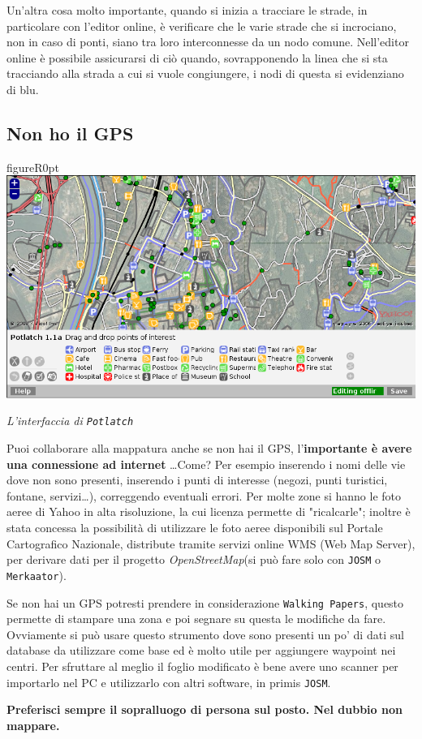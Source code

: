 \documentclass[a4paper,twoside,12pt,]{article}
\newcommand{\osm}{\emph{OpenStreetMap}\xspace}
\newcommand{\gps}{GPS\xspace}
\newcommand{\soft}[1]{\texttt{#1}}
\begin{document}
Un'altra cosa molto importante, quando si inizia a tracciare le strade, in particolare con l'editor online, è verificare che le varie strade che si incrociano, non in caso di ponti, siano tra loro interconnesse da un nodo comune. Nell'editor online è possibile assicurarsi di ciò quando, sovrapponendo la linea che si sta tracciando alla strada a cui si vuole congiungere, i nodi di questa si evidenziano di blu.
\subsection{Non ho il \gps}
\begin{wrapfloat}{figure}{R}{0pt}
 \includegraphics[width=0.7\columnwidth]{potlatch.png}
 \caption{\textit{L'interfaccia di \soft{Potlatch}}}
\end{wrapfloat}
Puoi collaborare alla mappatura anche se non hai il \gps, l'\textbf{importante è avere una connessione ad internet} \dots Come? Per esempio inserendo i nomi delle vie dove non sono presenti, inserendo i punti di interesse (negozi, punti turistici, fontane, servizi\dots), correggendo eventuali errori. Per molte zone si hanno le foto aeree di Yahoo in alta risoluzione, la cui licenza permette di "ricalcarle"; inoltre è stata concessa la possibilità di utilizzare le foto aeree disponibili sul Portale Cartografico Nazionale, distribute tramite servizi online WMS (Web Map Server), per derivare dati per il progetto \osm (si può fare solo con \soft{JOSM} o \soft{Merkaator}). 

Se non hai un \gps potresti prendere in considerazione \soft{Walking Papers}, questo permette di stampare una zona e poi segnare su questa le modifiche da fare. Ovviamente si può usare questo strumento dove sono presenti un po' di dati sul database da utilizzare come base ed è molto utile per aggiungere waypoint nei centri. Per sfruttare al meglio il foglio modificato è bene avere uno scanner per importarlo nel PC e utilizzarlo con altri software, in primis \soft{JOSM}.

\textbf{Preferisci sempre il sopralluogo di persona sul posto. Nel dubbio non mappare.}
\end{document}
